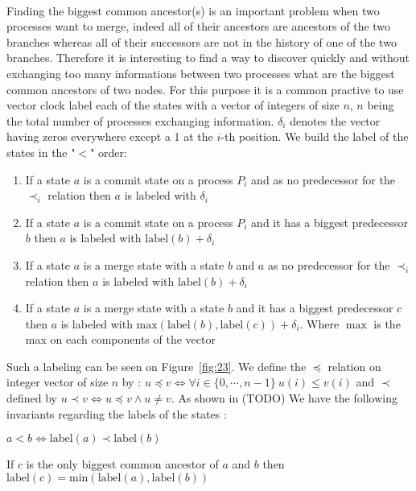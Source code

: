 \paragraph{} Finding the biggest common ancestor(s) is an important problem when two processes want to merge, indeed all of their ancestors are ancestors of the two branches whereas all of their successors are not in the history of one of the two branches. Therefore it is interesting to find a way to discover quickly and without exchanging too many informations between two processes what are the biggest common ancestors of two nodes. For this purpose it is a common practive to use vector clock label each of the states with a vector of integers of size $n$, $n$ being the total number of processes exchanging information. $\delta_i$ denotes the vector having zeros everywhere except a 1 at the $i$-th position. We build the label of the states in the "$<$" order:
\begin{enumerate}
 \item If a state $a$ is a commit state on a process $P_i$ and as no predecessor for the $\prec_i$ relation then $a$ is labeled with $\delta_i$
 \item If a state $a$ is a commit state on a process $P_i$ and it has a biggest predecessor $b$ then $a$ is labeled with $\mathrm{label}(b) + \delta_i$
 \item If a state $a$ is a merge state with a state $b$ and $a$ as no predecessor for the $\prec_i$ relation then $a$ is labeled with $\mathrm{label}(b) + \delta_i$
 \item If a state $a$ is a merge state with a state $b$ and it has a biggest predecessor $c$ then $a$ is labeled with $\mathrm{max}(\mathrm{label}(b),\mathrm{label}(c)) + \delta_i$. Where $\max$ is the max on each components of the vector
\end{enumerate}
Such a labeling can be seen on Figure~\ref{fig:23}. We define the $\preccurlyeq$ relation on integer vector of size $n$ by : $u \preccurlyeq v \Leftrightarrow \forall i \in \{0,\cdots,n-1\}\  u(i) \leq v(i)$ and $\prec$ defined by $u \prec v \Leftrightarrow u \preccurlyeq v \wedge u \neq v$. As shown in (TODO) We have the following invariants regarding the labels of the states :
\begin{proposition}
  \label{prop1}
 $ a < b \Leftrightarrow \mathrm{label}(a) \prec  \mathrm{label}(b)$
\end{proposition}
\begin{proposition}
  \label{propmin}
 If $c$ is the only biggest common ancestor of $a$ and $b$ then $\mathrm{label}(c) = \mathrm{min}(\mathrm{label}(a),\mathrm{label}(b))$
\end{proposition}

